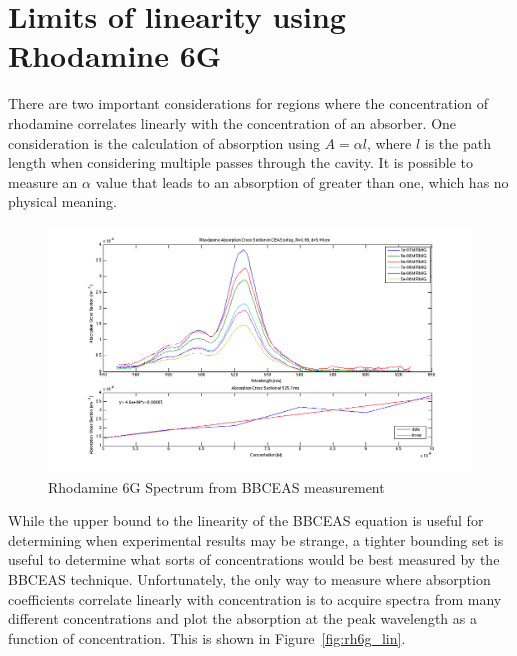 \section{Limits of linearity using Rhodamine 6G}\label{sec:rhodamine}

There are two important considerations for regions where the concentration of
rhodamine correlates linearly with the concentration of an absorber. One
consideration is the calculation of absorption using $A = \alpha  l$, where $l$
is the path length when considering multiple passes through the cavity.  It is
possible to measure an $\alpha$ value that leads to an absorption of greater
than one, which has no physical meaning.

\begin{figure}
\begin{center}
\includegraphics[width=\textwidth]{figures/Rh6G_absorption_cross_section_and_linearity}
\end{center}
\caption{Rhodamine 6G Spectrum from \ac{BBCEAS} measurement}
\label{fig:rh6g}
\end{figure}


While the upper bound to the linearity of the \ac{BBCEAS} equation is useful
for determining when experimental results may be strange, a tighter bounding
set is useful to determine what sorts of concentrations would be best measured
by the \ac{BBCEAS} technique. Unfortunately, the only way to measure where
absorption coefficients correlate linearly with concentration is to acquire
spectra from many different concentrations and plot the absorption at the peak
wavelength as a function of concentration. This is shown in
Figure~\ref{fig:rh6g_lin}.

